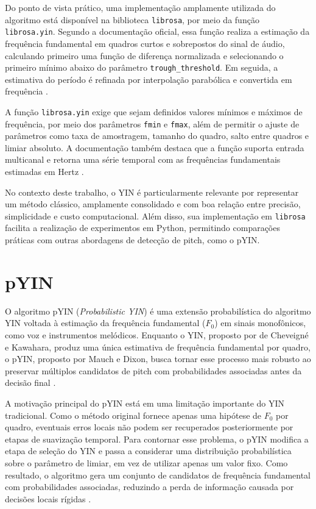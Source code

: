 Do ponto de vista prático, uma implementação amplamente utilizada do algoritmo está disponível na biblioteca \texttt{librosa}, por meio da função \texttt{librosa.yin}. Segundo a documentação oficial, essa função realiza a estimação da frequência fundamental em quadros curtos e sobrepostos do sinal de áudio, calculando primeiro uma função de diferença normalizada e selecionando o primeiro mínimo abaixo do parâmetro \texttt{trough\_threshold}. Em seguida, a estimativa do período é refinada por interpolação parabólica e convertida em frequência \cite{librosa_yin_docs}.

A função \texttt{librosa.yin} exige que sejam definidos valores mínimos e máximos de frequência, por meio dos parâmetros \texttt{fmin} e \texttt{fmax}, além de permitir o ajuste de parâmetros como taxa de amostragem, tamanho do quadro, salto entre quadros e limiar absoluto. A documentação também destaca que a função suporta entrada multicanal e retorna uma série temporal com as frequências fundamentais estimadas em Hertz \cite{librosa_yin_docs}.

No contexto deste trabalho, o YIN é particularmente relevante por representar um método clássico, amplamente consolidado e com boa relação entre precisão, simplicidade e custo computacional. Além disso, sua implementação em \texttt{librosa} facilita a realização de experimentos em Python, permitindo comparações práticas com outras abordagens de detecção de pitch, como o pYIN.


\section{pYIN}
O algoritmo pYIN (\textit{Probabilistic YIN}) é uma extensão probabilística do algoritmo YIN voltada à estimação da frequência fundamental (\(F_0\)) em sinais monofônicos, como voz e instrumentos melódicos. Enquanto o YIN, proposto por de Cheveigné e Kawahara, produz uma única estimativa de frequência fundamental por quadro, o pYIN, proposto por Mauch e Dixon, busca tornar esse processo mais robusto ao preservar múltiplos candidatos de pitch com probabilidades associadas antes da decisão final \cite{decheveigne2002yin,mauch2014pyin}.

A motivação principal do pYIN está em uma limitação importante do YIN tradicional. Como o método original fornece apenas uma hipótese de \(F_0\) por quadro, eventuais erros locais não podem ser recuperados posteriormente por etapas de suavização temporal. Para contornar esse problema, o pYIN modifica a etapa de seleção do YIN e passa a considerar uma distribuição probabilística sobre o parâmetro de limiar, em vez de utilizar apenas um valor fixo. Como resultado, o algoritmo gera um conjunto de candidatos de frequência fundamental com probabilidades associadas, reduzindo a perda de informação causada por decisões locais rígidas \cite{mauch2014pyin}.

